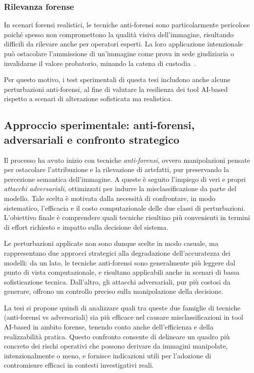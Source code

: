 \subsubsection*{Rilevanza forense}

In scenari forensi realistici, le tecniche anti-forensi sono particolarmente pericolose poiché spesso non compromettono la qualità visiva dell’immagine, risultando difficili da rilevare anche per operatori esperti. La loro applicazione intenzionale può ostacolare l’ammissione di un’immagine come prova in sede giudiziaria o invalidarne il valore probatorio, minando la catena di custodia~\cite{costantini2019digital, faqir2023digital}.

Per questo motivo, i test sperimentali di questa tesi includono anche alcune perturbazioni anti-forensi, al fine di valutare la resilienza dei tool AI-based rispetto a scenari di alterazione sofisticata ma realistica.


\subsection{Approccio sperimentale: anti-forensi, adversariali e confronto strategico}
\label{sec:approccio-sperimentale}

Il processo ha avuto inizio con tecniche \textit{anti-forensi}, ovvero manipolazioni pensate per ostacolare l’attribuzione e la rilevazione di artefatti, pur preservando la percezione semantica dell’immagine. A queste è seguito l’impiego di veri e propri \textit{attacchi adversariali}, ottimizzati per indurre la misclassificazione da parte del modello. Tale scelta è motivata dalla necessità di confrontare, in modo sistematico, l’efficacia e il costo computazionale delle due classi di perturbazioni. L’obiettivo finale è comprendere quali tecniche risultino più convenienti in termini di effort richiesto e impatto sulla decisione del sistema.

Le perturbazioni applicate non sono dunque scelte in modo casuale, ma rappresentano due approcci strategici alla degradazione dell’accuratezza dei modelli: da un lato, le tecniche anti-forensi sono generalmente più leggere dal punto di vista computazionale, e risultano applicabili anche in scenari di bassa sofisticazione tecnica. Dall’altro, gli attacchi adversariali, pur più costosi da generare, offrono un controllo preciso sulla manipolazione della decisione.

La tesi si propone quindi di analizzare quali tra queste due famiglie di tecniche (anti-forensi vs adversariali) sia più efficace nel causare misclassificazioni in tool AI-based in ambito forense, tenendo conto anche dell’efficienza e della realizzabilità pratica. Questo confronto consente di delineare un quadro più concreto dei rischi operativi che possono derivare da immagini manipolate, intenzionalmente o meno, e fornisce indicazioni utili per l’adozione di contromisure efficaci in contesti investigativi reali.
